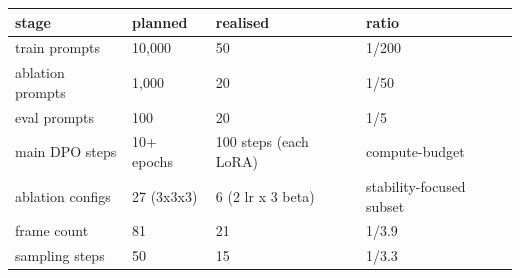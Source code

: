 \begin{tabular}{llll}
\toprule
stage & planned & realised & ratio \\
\midrule
train prompts & 10,000 & 50 & 1/200 \\
ablation prompts & 1,000 & 20 & 1/50 \\
eval prompts & 100 & 20 & 1/5 \\
main DPO steps & 10+ epochs & 100 steps (each LoRA) & compute-budget \\
ablation configs & 27 (3x3x3) & 6 (2 lr x 3 beta) & stability-focused subset \\
frame count & 81 & 21 & 1/3.9 \\
sampling steps & 50 & 15 & 1/3.3 \\
\bottomrule
\end{tabular}
